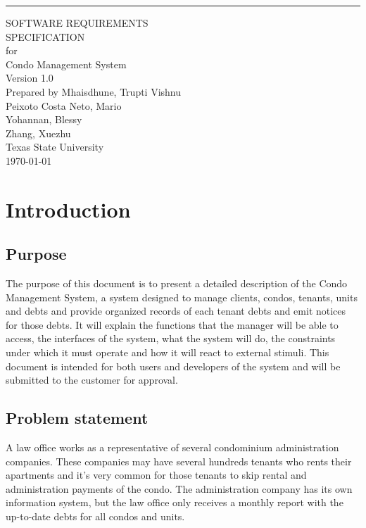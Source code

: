 \documentclass{scrreprt}
\date{}
\def\myversion{1.0 }
\begin{document}
\begin{flushright}
    \rule{16cm}{5pt}\vskip1cm
    \begin{bfseries}
        \Huge{SOFTWARE REQUIREMENTS\\ SPECIFICATION}\\
        \vspace{1.5cm}
        for\\
        \vspace{1.5cm}
        Condo Management System\\
        \vspace{1.5cm}
        \LARGE{Version \myversion}\\
        \vspace{1.5cm}
        Prepared by Mhaisdhune, Trupti Vishnu\\
        Peixoto Costa Neto, Mario\\
        Yohannan, Blessy\\
        Zhang, Xuezhu\\
        \vspace{1.5cm}
        Texas State University\\
        \vspace{1.5cm}
        \today\\
    \end{bfseries}
\end{flushright}

\tableofcontents

\chapter{Introduction}

\section{Purpose}
The purpose of this document is to present a detailed description of the Condo Management System, a system designed to manage clients, condos, tenants, units and debts and provide organized records of each tenant debts and emit notices for those debts. It will explain the functions that the manager will be able to access, the interfaces of the system, what the system will do, the constraints under which it must operate and how it will react to external stimuli. This document is intended for both users and developers of the system and will be submitted to the customer for approval.

\section{Problem statement}
A law office works as a representative of several condominium administration companies. These companies may have several hundreds tenants who rents their apartments and it’s very common for those tenants to skip rental and administration payments of the condo. The administration company has its own information system, but the law office only receives a monthly report with the up-to-date debts for all condos and units.
\end{document}

